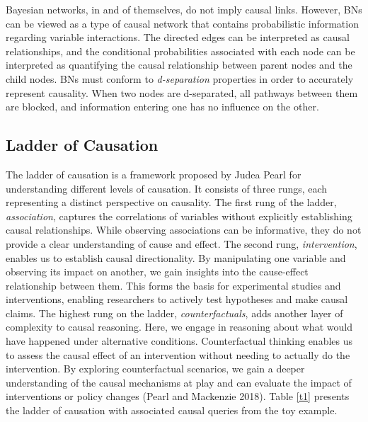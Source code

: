 \documentclass[twocol]{ametsoc}
\begin{document}
Bayesian networks, in and of themselves, do not imply causal links.
However, BNs can be viewed as a type of causal network that contains
probabilistic information regarding variable interactions. The directed
edges can be interpreted as causal relationships, and the conditional
probabilities associated with each node can be interpreted as
quantifying the causal relationship between parent nodes and the child
nodes. BNs must conform to \emph{d-separation} properties in order to
accurately represent causality. When two nodes are d-separated, all
pathways between them are blocked, and information entering one has no
influence on the other.

\hypertarget{ladder-of-causation}{%
\subsection{Ladder of Causation}\label{ladder-of-causation}}

The ladder of causation is a framework proposed by Judea Pearl for
understanding different levels of causation. It consists of three rungs,
each representing a distinct perspective on causality. The first rung of
the ladder, \emph{association}, captures the correlations of variables
without explicitly establishing causal relationships. While observing
associations can be informative, they do not provide a clear
understanding of cause and effect. The second rung, \emph{intervention},
enables us to establish causal directionality. By manipulating one
variable and observing its impact on another, we gain insights into the
cause-effect relationship between them. This forms the basis for
experimental studies and interventions, enabling researchers to actively
test hypotheses and make causal claims. The highest rung on the ladder,
\emph{counterfactuals}, adds another layer of complexity to causal
reasoning. Here, we engage in reasoning about what would have happened
under alternative conditions. Counterfactual thinking enables us to
assess the causal effect of an intervention without needing to actually
do the intervention. By exploring counterfactual scenarios, we gain a
deeper understanding of the causal mechanisms at play and can evaluate
the impact of interventions or policy changes (Pearl and Mackenzie
2018). Table \ref{t1} presents the ladder of causation with associated
causal queries from the toy example.

\begin{table}[h]
\caption{Ladder of Causation}\label{t1}
\begin{center}
\end{center}
\end{table}
\end{document}
